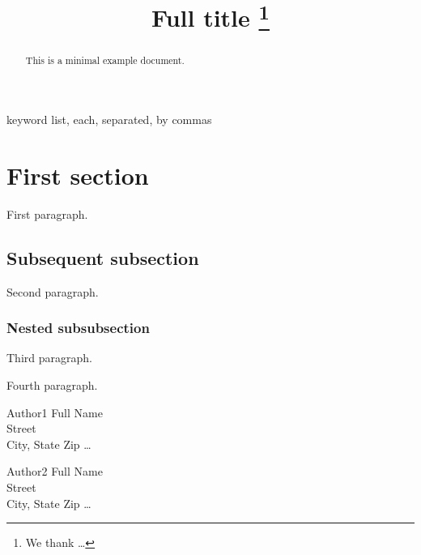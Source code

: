 \documentclass{sp}
\title[Short title]{Full title%
  \thanks{We thank \ldots}}
\author[Author1, Author2, Author3]{%
  \spauthor{Author1 Full Name \\ \institute{Institute1}} \AND
  \spauthor{Author2 Full Name \\ \institute{Institute2}} \AND
  \spauthor{Author3 Full Name \\ \institute{Institute3}}}
\begin{document}
\maketitle

\begin{abstract}
  This is a minimal example document.
\end{abstract}

\begin{keywords}
  keyword list, each, separated, by commas
\end{keywords}

\section{First section}

First paragraph.

\subsection{Subsequent subsection}

Second paragraph.

\subsubsection{Nested subsubsection}

Third paragraph.

Fourth paragraph.




\begin{addresses}
  \begin{address}
    Author1 Full Name \\
    Street \\
    City, State Zip \ldots \\
  \end{address}
  \begin{address}
    Author2 Full Name \\
    Street \\
    City, State Zip \dots \\
  \end{address}
\end{addresses}
\end{document}
